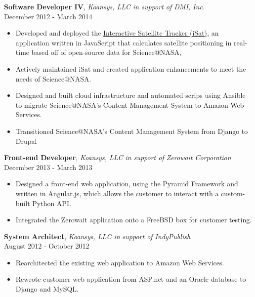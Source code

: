\documentclass[margin,line,10pt]{resume}
\begin{document}
\begin{resume}
\textbf{Software Developer IV}, \textsl{Koansys, LLC in support of DMI, Inc.}\\December 2012 - March 2014\vspace{2mm}%
\begin{itemize}
    \item Developed and deployed the \href{http://science.nasa.gov/iSat/}{Interactive Satellite Tracker (iSat)}, an application written in JavaScript that calculates satellite positioning in real-time based off of open-source data for Science@NASA, 
    \item Actively maintained iSat and created application enhancements to meet the needs of Science@NASA.
    \item Designed and built cloud infrastructure and automated scrips using Ansible to migrate Science@NASA’s Content Management System to Amazon Web Services.
    \item Transitioned Science@NASA’s Content Management System from Django to Drupal
\end{itemize}

\textbf{Front-end Developer}, \textsl{Koansys, LLC in support of Zerowait Corporation}\\December 2013 - March 2013\vspace{2mm}%
\begin{itemize}
    \item Designed a front-end  web application, using the Pyramid Framework and  written in Angular.js, which allows the customer to interact with a custom-built Python API.  
    \item Integrated the Zerowait application onto a FreeBSD box for customer testing.
\end{itemize}

\textbf{System Architect}, \textsl{Koansys, LLC in support of IndyPublish}\\August 2012 - October 2012\vspace{2mm}%
\begin{itemize}
    \item Rearchitected the existing web application to Amazon Web Services. 
    \item Rewrote customer web application from ASP.net and an Oracle database to Django and MySQL.
\end{itemize}


\end{resume}
\end{document}

